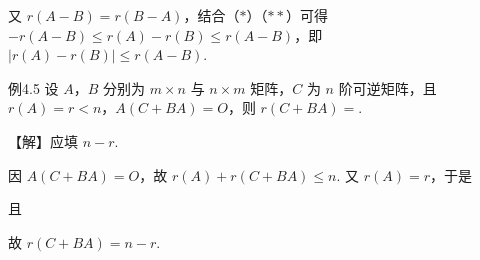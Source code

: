 %
%

\begin{fnote}
又 $r(A-B)=r(B-A)$，结合（$\ast$）（$\ast\ast$）可得 $-r(A-B)\le r(A)-r(B)\le r(A-B)$，即 $|r(A)-r(B)|\le r(A-B)$.
\end{fnote}

\begin{fcard}{例4.5}
设 $A$，$B$ 分别为 $m\times n$ 与 $n\times m$ 矩阵，$C$ 为 $n$ 阶可逆矩阵，且 $r(A)=r<n$，$A(C+BA)=O$，则 $r(C+BA)=$\underline{\hspace{2.6em}}.

【解】应填 $n-r$.

因 $A(C+BA)=O$，故 $r(A)+r(C+BA)\le n$. 又 $r(A)=r$，于是


且


故 $r(C+BA)=n-r$.
\end{fcard}


